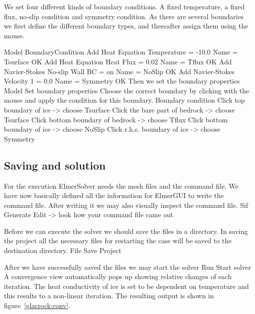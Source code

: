 We set four different kinds of boundary conditions. A fixed temperature, a fixed 
flux, no-slip condition and symmetry condition. As there are several boundaries
we first define the different boundary types, and thereafter assign them using the mouse.

\ttbegin
Model
  BoundaryCondition
    Add 
      Heat Equation
        Temperature = -10.0
      Name = Tsurface
      OK
    Add 
      Heat Equation
        Heat Flux = 0.02
      Name = Tflux
      OK
    Add 
      Navier-Stokes
        No-slip Wall BC = on
      Name = NoSlip
      OK
    Add 
      Navier-Stokes
        Velocity 1 = 0.0
      Name = Symmetry
      OK
\ttend   
Then we set the boundary properties 
\ttbegin
Model 
  Set boundary properties  
\ttend
Choose the correct boundary by clicking with the mouse
and apply the condition for this boundary.
\ttbegin
Boundary condition
  Click top boundary of ice -> choose Tsurface
  Click the bare part of bedrock -> choose Tsurface
  Click bottom boundary of bedrock -> choose Tflux
  Click bottom boundary of ice -> choose NoSlip
  Click r.h.s. boundary of ice -> choose Symmetry
\ttend

\subsection*{Saving and solution}

For the execution 
ElmerSolver needs the mesh files and the command file. We have now basically defined
all the information for ElmerGUI to write the command file. After writing it we may also visually 
inspect the command file.
\ttbegin
Sif 
  Generate
  Edit -> look how your command file came out  
\ttend

Before we can execute the solver we should save the files in a directory. In saving the project all the
necessary files for restarting the case will be saved to the 
destination directory.
\ttbegin
File 
  Save Project
\ttend

After we have successfully saved the files we may start the solver
\ttbegin
Run
  Start solver
\ttend
A convergence view automatically pops up showing relative changes of each iteration.
The heat conductivity of ice is set to be dependent on temperature and this results to a 
non-linear iteration.
The resulting output is shown in figure~\ref{glacrock:conv}.

